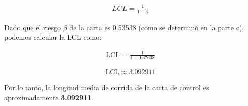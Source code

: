 \documentclass{article}
\begin{document}
\begin{enumerate}[label = \textbf{\alph*)}]
    \begin{align*}
    LCL = \frac{1}{1 - \beta}
    \end{align*}
    
    Dado que el riesgo $\beta$ de la carta es 0.53538 (como se determinó en la parte c), podemos calcular la LCL como:

    \begin{align*}
    \text{LCL} = \frac{1}{1 - 0.67668}
    \end{align*}

    \begin{align*}
    \text{LCL} \approx 3.092911
    \end{align*}

    Por lo tanto, la longitud media de corrida de la carta de control es aproximadamente \textbf{3.092911}.

\end{enumerate}
\end{document}
